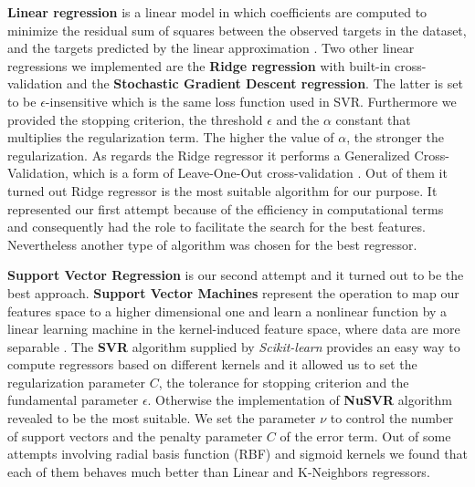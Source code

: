 \textbf{Linear regression} is a linear model in which coefficients are computed to minimize the residual sum of squares between the observed targets in the dataset, and the targets predicted by the linear approximation \cite{scikit-learn}. 
Two other linear regressions we implemented are the \textbf{Ridge regression} with built-in cross-validation and the \textbf{Stochastic Gradient Descent regression}. 
The latter is set to be $\epsilon$-insensitive which is the same loss function used in SVR. Furthermore we provided the stopping criterion, the threshold $\epsilon$ and the $\alpha$ constant that multiplies the regularization term. The higher the value of $\alpha$, the stronger the regularization. As regards the Ridge regressor it performs a Generalized Cross-Validation, which is a form of Leave-One-Out cross-validation \cite{scikit-learn}. Out of them it turned out Ridge regressor is the most suitable algorithm for our purpose.
It represented our first attempt because of the efficiency in computational terms and consequently had the role to facilitate the search for the best features. 
Nevertheless another type of algorithm was chosen for the best regressor.

\textbf{Support Vector Regression} is our second attempt and it turned out to be the best approach.
\textbf{Support Vector Machines} represent the operation to map our features space to a higher dimensional one and learn a nonlinear function by a linear learning machine in the kernel-induced feature space, where data are more separable \cite{yang2008regression}.
The \textbf{SVR} algorithm supplied by \textit{Scikit-learn} provides an easy way to compute regressors based on different kernels and it allowed us to set the regularization parameter $C$, the tolerance for stopping criterion and the fundamental parameter $\epsilon$.
Otherwise the implementation of \textbf{NuSVR} algorithm revealed to be the most suitable. We set the parameter $\nu$ to control the number of support vectors and the penalty parameter $C$ of the error term.
Out of some attempts involving radial basis function (RBF) and sigmoid kernels we found that each of them behaves much better than Linear and K-Neighbors regressors. 

